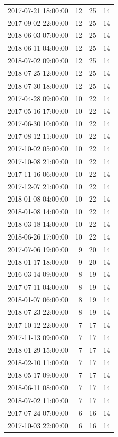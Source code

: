 \begin{tabular}{lrrr}
2017-07-21 18:00:00 & 12 & 25 & 14 \\
2017-09-02 22:00:00 & 12 & 25 & 14 \\
2018-06-03 07:00:00 & 12 & 25 & 14 \\
2018-06-11 04:00:00 & 12 & 25 & 14 \\
2018-07-02 09:00:00 & 12 & 25 & 14 \\
2018-07-25 12:00:00 & 12 & 25 & 14 \\
2018-07-30 18:00:00 & 12 & 25 & 14 \\
2017-04-28 09:00:00 & 10 & 22 & 14 \\
2017-05-16 17:00:00 & 10 & 22 & 14 \\
2017-06-30 10:00:00 & 10 & 22 & 14 \\
2017-08-12 11:00:00 & 10 & 22 & 14 \\
2017-10-02 05:00:00 & 10 & 22 & 14 \\
2017-10-08 21:00:00 & 10 & 22 & 14 \\
2017-11-16 06:00:00 & 10 & 22 & 14 \\
2017-12-07 21:00:00 & 10 & 22 & 14 \\
2018-01-08 04:00:00 & 10 & 22 & 14 \\
2018-01-08 14:00:00 & 10 & 22 & 14 \\
2018-03-18 14:00:00 & 10 & 22 & 14 \\
2018-06-26 17:00:00 & 10 & 22 & 14 \\
2017-07-06 19:00:00 & 9 & 20 & 14 \\
2018-01-17 18:00:00 & 9 & 20 & 14 \\
2016-03-14 09:00:00 & 8 & 19 & 14 \\
2017-07-11 04:00:00 & 8 & 19 & 14 \\
2018-01-07 06:00:00 & 8 & 19 & 14 \\
2018-07-23 22:00:00 & 8 & 19 & 14 \\
2017-10-12 22:00:00 & 7 & 17 & 14 \\
2017-11-13 09:00:00 & 7 & 17 & 14 \\
2018-01-29 15:00:00 & 7 & 17 & 14 \\
2018-02-10 11:00:00 & 7 & 17 & 14 \\
2018-05-17 09:00:00 & 7 & 17 & 14 \\
2018-06-11 08:00:00 & 7 & 17 & 14 \\
2018-07-02 11:00:00 & 7 & 17 & 14 \\
2017-07-24 07:00:00 & 6 & 16 & 14 \\
2017-10-03 22:00:00 & 6 & 16 & 14 \\

\end{tabular}
